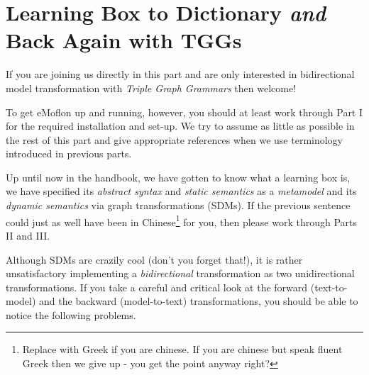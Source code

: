 \section{Learning Box to Dictionary \emph{and} Back Again with TGGs}
\genHeader
\label{chap:Learning-Box-to-Dictionary-and-Back-Again}

If you are joining us directly in this part and are only interested in bidirectional model transformation with \emph{Triple Graph Grammars} then welcome!

To get eMoflon up and running, however, you should at least work through Part I for the required installation and set-up. We try to assume as little as possible
in the rest of this part and give appropriate references when we use terminology introduced in previous parts.

Up until now in the handbook, we have gotten to know what a learning box is, we have specified its \emph{abstract syntax} and \emph{static semantics} as a
\emph{metamodel} and its \emph{dynamic semantics} via graph transformations (SDMs). If the previous sentence could just as well have been in
Chinese\footnote{Replace with Greek if you are chinese.  If you are chinese but speak fluent Greek then we give up - you get the point anyway right?} for you,
then please work through Parts II and III.

Although SDMs are crazily cool (don't you forget that!), it is rather unsatisfactory implementing a \emph{bidirectional} transformation as two unidirectional
transformations. If you take a careful and critical look at the forward (text-to-model) and the backward (model-to-text) transformations, you should be able to
notice the following problems.

